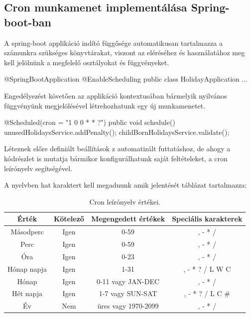 \subsection{Cron munkamenet implementálása Spring-boot-ban}

A spring-boot applikáció indító függősége automatikusan tartalmazza a számunkra szükséges könyvtárakat, viszont az eléréséhez és használatához meg kell jelölnünk a megfelelő osztályokat és függvényeket.

\begin{java}
	@SpringBootApplication
	@EnableScheduling
	public class HolidayApplication {...}
\end{java}

Engedélyezést követően az applikáció kontextusában bármelyik nyilvános függvényünk megjelölésével létrehozhatunk egy új munkamenetet.

\begin{java}
@Scheduled(cron = "1 0 0 * * ?")
public void schedule() {
	unusedHolidaysService.addPenalty();
	childBornHolidaysService.validate();
}
\end{java}

Léteznek előre definiált beállítások z automatizált futtatáshoz, de ahogy a kódrészlet is mutatja bármikor konfigurálhatunk saját feltételeket, a cron leírónyelv segítségével.

A nyelvben hat karaktert kell megadnunk amik jelentését  táblázat tartalmazza:

\begin{table}[h]
	\centering
	\caption{Cron leírónyelv értékei.}
	\label{tab:Cron leírónyelv}
\begin{tabular}{|c|c|c|c|}
	\hline
	Érték & Kötelező & Megengedett értékek & Speciális karakterek \\
	\hline
	Másodperc & Igen & 0-59 & , - * / \\
	\hline
	Perc & Igen & 0-59 & , - * / \\
	\hline
	Óra & Igen & 0-23 & , - * / \\
	\hline
	Hónap napja & Igen & 1-31 & , - * ? / L W C \\
	\hline
	Hónap & Igen & 0-11 vagy JAN-DEC & , - * / \\
	\hline
	Hét napja & Igen & 1-7 vagy SUN-SAT & , - * ? / L C \# \\
	\hline
	Év & Nem & üres vagy 1970-2099 & , - * / \\
	\hline
\end{tabular}
\end{table}

